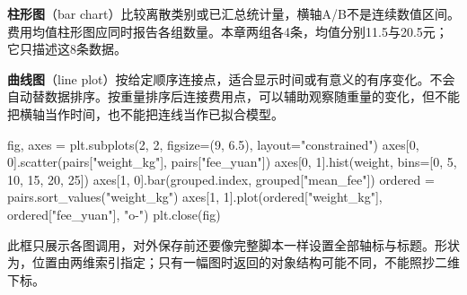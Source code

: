 \documentclass[UTF8,fontset=none,zihao=-4,a4paper]{ctexart}
\newcommand{\term}[1]{\textbf{#1}}
\newcommand{\code}[1]{\texttt{\detokenize{#1}}}
\numberwithin{equation}{section}
\numberwithin{figure}{section}
\begin{document}
\term{柱形图}（bar chart）比较离散类别或已汇总统计量，横轴A/B不是连续数值区间。费用均值柱形图应同时报告各组数量。本章两组各4条，均值分别11.5与20.5元；它只描述这8条数据。

\term{曲线图}（line plot）按给定顺序连接点，适合显示时间或有意义的有序变化。\code{plot}不会自动替数据排序。按重量排序后连接费用点，可以辅助观察随重量的变化，但不能把横轴当作时间，也不能把连线当作已拟合模型。
\begin{pycode}
fig, axes = plt.subplots(2, 2, figsize=(9, 6.5),
                          layout="constrained")
axes[0, 0].scatter(pairs["weight_kg"], pairs["fee_yuan"])
axes[0, 1].hist(weight, bins=[0, 5, 10, 15, 20, 25])
axes[1, 0].bar(grouped.index, grouped["mean_fee"])
ordered = pairs.sort_values("weight_kg")
axes[1, 1].plot(ordered["weight_kg"], ordered["fee_yuan"], "o-")
plt.close(fig)
\end{pycode}
此框只展示各图调用，对外保存前还要像完整脚本一样设置全部轴标与标题。\code{axes}形状为\code{(2, 2)}，位置由两维索引指定；只有一幅图时返回的对象结构可能不同，不能照抄二维下标。
\end{document}
